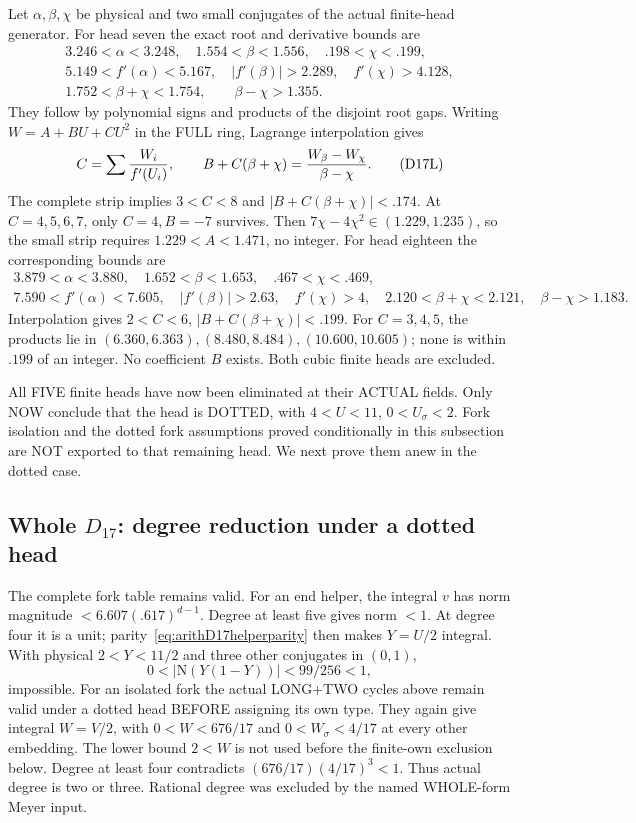 Let \(\alpha,\beta,\chi\) be physical and two
small conjugates of the actual finite-head generator.
For head seven the exact root and derivative
bounds are
\[
 \begin{gathered}
3.246<\alpha<3.248,\quad1.554<\beta<1.556,\quad
 .198<\chi<.199,\\
5.149<f'(\alpha)<5.167,\quad|f'(\beta)|>2.289,\quad
 f'(\chi)>4.128,\\
1.752<\beta+\chi<1.754,\qquad\beta-\chi>1.355 .
 \end{gathered}
\]
They follow by polynomial signs and products
of the disjoint root gaps.
Writing \(W=A+BU+CU^2\) in the FULL ring,
Lagrange interpolation gives
\[
 C=\sum {W_i\over f'(U_i)},\qquad
 B+C(\beta+\chi)={W_\beta-W_\chi\over\beta-\chi}.
\tag{D17L}\label{eq:arithD17interpolation}
\]
The complete strip implies \(3<C<8\) and
\(|B+C(\beta+\chi)|<.174\).
At \(C=4,5,6,7\), only \(C=4,B=-7\) survives.
Then \(7\chi-4\chi^2\in(1.229,1.235)\),
so the small strip requires \(1.229<A<1.471\),
no integer.
For head eighteen the corresponding bounds are
\[
 \begin{gathered}
3.879<\alpha<3.880,\quad1.652<\beta<1.653,\quad
 .467<\chi<.469,\\
7.590<f'(\alpha)<7.605,\quad|f'(\beta)|>2.63,\quad
 f'(\chi)>4,\quad
2.120<\beta+\chi<2.121,\quad\beta-\chi>1.183 .
 \end{gathered}
\]
Interpolation gives \(2<C<6\),
\(|B+C(\beta+\chi)|<.199\).
For \(C=3,4,5\), the products lie in
\((6.360,6.363),(8.480,8.484),(10.600,10.605)\);
none is within \(.199\) of an integer.
No coefficient \(B\) exists.
Both cubic finite heads are excluded.

All FIVE finite heads have now been eliminated
at their ACTUAL fields.
Only NOW conclude that the head is DOTTED,
with \(4<U<11\), \(0<U_\sigma<2\).
Fork isolation and the dotted fork assumptions
proved conditionally in this subsection are NOT
exported to that remaining head.
We next prove them anew in the dotted case.

\subsection{Whole \(D_{17}\): degree reduction under a dotted head}
\label{app:arithD17degrees}

The complete fork table remains valid.
For an end helper, the integral \(v\) has norm
magnitude \(<6.607(.617)^{d-1}\).
Degree at least five gives norm \(<1\).
At degree four it is a unit;
parity~\eqref{eq:arithD17helperparity} then makes
\(Y=U/2\) integral.
With physical \(2<Y<11/2\) and three other
conjugates in \((0,1)\),
\[
                 0<|\mathrm N(Y(1-Y))|<99/256<1,
\]
impossible.
For an isolated fork the actual LONG+TWO
cycles above remain valid under a dotted head
BEFORE assigning its own type.
They again give integral \(W=V/2\), with
\(0<W<676/17\) and \(0<W_\sigma<4/17\)
at every other embedding.
The lower bound \(2<W\) is not used before
the finite-own exclusion below.
Degree at least four contradicts
\((676/17)(4/17)^3<1\).
Thus actual degree is two or three.
Rational degree was excluded by the named
WHOLE-form Meyer input.

